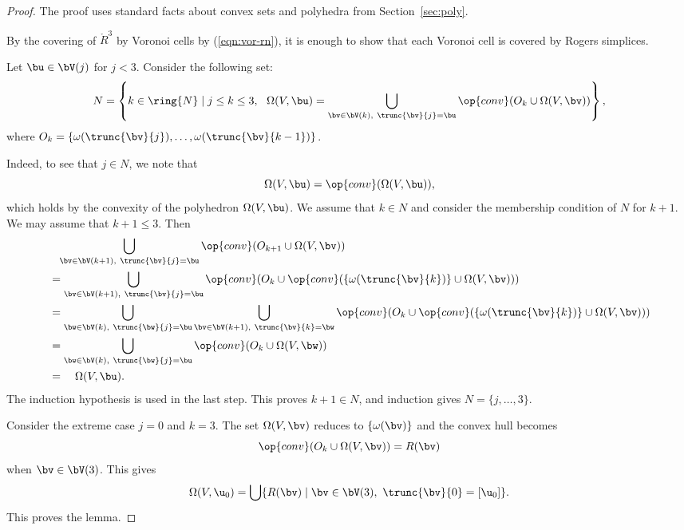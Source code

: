 \begin{proof} 
The proof uses standard facts about convex sets and polyhedra from
Section~\ref{sec:poly}.


%
By the covering of $\ring{R}^3$  by Voronoi cells by (\ref{eqn:vor-rn}),
it is enough to show that each Voronoi cell is covered by Rogers simplices.

Let $\bu\in \bV(j)$ for $j<3$.
Consider the following set:
\[  
N = \left\{k\in\ring{N}\mid j\le k\le 3, ~~\Omega(V,\bu) 
= \bigcup_{\bv \in \bV(k),~\trunc{\bv}{j}=\bu}
\op{conv}(O_k \cup\Omega(V,\bv)) %
\right\},
\] 
where $O_k = \{\omega(\trunc{\bv}{j}),\ldots,\omega(\trunc{\bv}{k-1})\}$.

  Indeed, to see that $j\in N$, we note that
\[  
\Omega(V,\bu) = \op{conv}(\Omega(V,\bu)),
\] 
which holds by the convexity of the polyhedron $\Omega(V,\bu)$.
We assume that $k\in N$ and consider the membership condition of $N$  for
$k+1$.  We may assume that $k+1\le 3$.
Then
\begin{align*} 
&\phantom{=}\bigcup _{\bv \in \bV(k+1),~\trunc{\bv}{j}=\bu}
\op{conv}(O_{k+1} \cup\Omega(V,\bv))
%
\vspace{6pt}\\
&=\bigcup _{\bv \in \bV(k+1),~\trunc{\bv}{j}=\bu}
\op{conv}(O_{k} \cup\op{conv}(\{\omega(\trunc{\bv}{k})\}\cup\Omega(V,\bv)))
\vspace{6pt}\\
&=\bigcup _{\bw\in \bV(k),~\trunc{\bw}{j}=\bu}
\bigcup_{\bv \in \bV(k+1),~\trunc{\bv}{k}=\bw}
\op{conv}(O_{k} \cup\op{conv}(\{\omega(\trunc{\bv}{k})\}\cup\Omega(V,\bv)))
\vspace{6pt}\\
&=\bigcup _{\bw\in \bV(k),~\trunc{\bw}{j}=\bu}
\op{conv}(O_{k} \cup \Omega(V,\bw)    )
\vspace{6pt}\\
&=\quad\Omega(V,\bu).
\end{align*}
The induction hypothesis is used in the last step.  
This proves $k+1\in N$, and induction gives $N=\{j,\ldots,3\}$.

Consider  the extreme case $j=0$ and $k=3$.  The set $\Omega(V,\bv)$
reduces to $\{\omega(\bv)\}$  and the convex hull becomes
\[  
\op{conv}(O_{k}\cup \Omega(V,\bv)) = R(\bv)
\] 
when $\bv\in \bV(3)$.
This gives
\begin{equation} 
\Omega(V,\u_0) = 
\bigcup \{ R(\bv) \mid \bv\in \bV(3),~\trunc{\bv}{0} =[\u_0]\}.
\end{equation}
This proves the lemma.
\end{proof}


